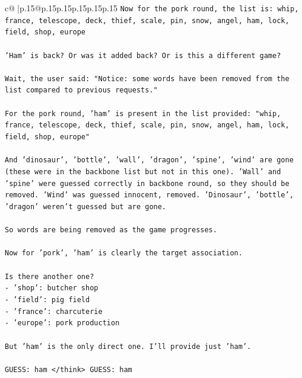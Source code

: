 \documentclass{article}
\begin{document}
{\begin{supertabular}{c@{$\;$}|p{.15\linewidth}@{}p{.15\linewidth}p{.15\linewidth}p{.15\linewidth}p{.15\linewidth}p{.15\linewidth}}
{{{\texttt{Now for the pork round, the list is: whip, france, telescope, deck, thief, scale, pin, snow, angel, ham, lock, field, shop, europe} \\
\\ 
\texttt{'Ham' is back? Or was it added back? Or is this a different game?} \\
\\ 
\texttt{Wait, the user said: "Notice: some words have been removed from the list compared to previous requests."} \\
\\ 
\texttt{For the pork round, 'ham' is present in the list provided: "whip, france, telescope, deck, thief, scale, pin, snow, angel, ham, lock, field, shop, europe"} \\
\\ 
\texttt{And 'dinosaur', 'bottle', 'wall', 'dragon', 'spine', 'wind' are gone (these were in the backbone list but not in this one). 'Wall' and 'spine' were guessed correctly in backbone round, so they should be removed. 'Wind' was guessed innocent, removed. 'Dinosaur', 'bottle', 'dragon' weren't guessed but are gone.} \\
\\ 
\texttt{So words are being removed as the game progresses.} \\
\\ 
\texttt{Now for 'pork', 'ham' is clearly the target association.} \\
\\ 
\texttt{Is there another one?} \\
\texttt{{-} 'shop': butcher shop} \\
\texttt{{-} 'field': pig field} \\
\texttt{{-} 'france': charcuterie} \\
\texttt{{-} 'europe': pork production} \\
\\ 
\texttt{But 'ham' is the only direct one. I'll provide just 'ham'.} \\
\\ 
\texttt{GUESS: ham </think> GUESS: ham} \\
            }
        }
    }
     \\ \\


\end{supertabular}}
\end{document}
